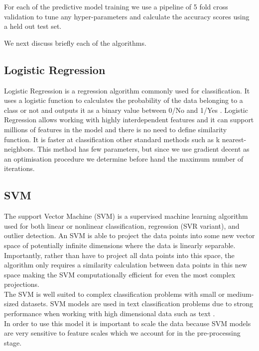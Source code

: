 \documentclass[sigconf, nonacm]{acmart}
\begin{document}
For each of the predictive model training we use a pipeline of 5 fold cross validation to tune any hyper-parameters and calculate the accuracy scores using a held out test set. 

We next discuss briefly each of the algorithms. \\

\subsection{Logistic Regression}

Logistic Regression is a regression algorithm commonly used for classification. It uses a logistic function to calculates the probability of the data belonging to a class or not and outputs it as a binary value between 0/No and 1/Yes \cite{hosmer2000applied}. Logistic Regression allows working with highly interdependent features and it can support millions of features in the model and there is no need to define similarity function. It is faster at classification other standard methods such as k nearest-neighbors. This method has few parameters, but since we use gradient decent as an optimisation procedure we determine before hand the maximum number of iterations. \\


\subsection{SVM}

The support Vector Machine (SVM) is a supervised machine learning algorithm used for both linear or nonlinear classification, regression (SVR variant), and outlier detection\cite{geron2017hands}. An SVM is able to project the data points into some new vector space of potentially infinite dimensions where the data is linearly separable. Importantly, rather than have to project all data points into this space, the algorithm only requires a similarity calculation between data points in this new space making the SVM computationally efficient for even the most complex projections.  \\

The SVM is well suited to complex classification problems with small or medium-sized datasets. SVM models are used in text classification problems due to strong performance when working with high dimensional data such as text \cite{wang2006optimal, vapnik2013nature}.\\

In order to use this model it is important to scale the data because SVM models are very sensitive to feature scales \cite{joachims1998text} which we account for in the pre-processing stage. \\
\end{document}
